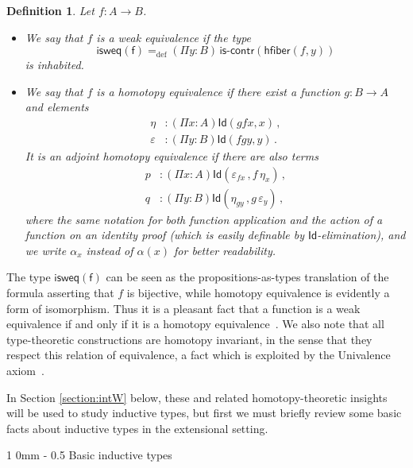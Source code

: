 \documentclass[reqno,10pt,a4paper,oneside]{amsart}
\makeatletter
\newcommand{\defeq}{=_{\mathrm{def}}}
\newcommand{\Id}{\mathsf{Id}}
\newcommand{\iscontr}{\mathsf{is}\text{-}\mathsf{contr}}
\newcommand{\hfiber}{\mathsf{hfiber}}
\renewcommand{\section}{\@startsection
  {section}%
   {1}%
  {0mm}%
   {-\baselineskip}%
  {0.5\baselineskip}%
   {\Large\bfseries}}%
\numberwithin{equation}{section}
\theoremstyle{mythm}
\theoremstyle{mydef}
\newtheorem{definition}[theorem]{Definition}
\theoremstyle{myrmk}
\makeatother
\begin{document}
\begin{definition} \label{thm:weq} Let $f : A \rightarrow B$.
\begin{itemize}
%
\item We say that $f$ is a \emph{weak equivalence} if  the type
\[
\mathsf{isweq(f)} \defeq (\Pi y : B) \,  \iscontr(\hfiber(f,y)) 
\]
is inhabited. 
%
\item We say that $f$ is a \emph{homotopy equivalence} if there exist a function 
$g : B\rightarrow A$ and elements
\begin{align*}
\eta &: (\Pi x : A) \Id( g  f  x , x) \,  ,\\
\varepsilon &: (\Pi y:B) \Id( f   g  y, y) \, .
\end{align*}
It is an \emph{adjoint homotopy equivalence} if there are also
terms
\begin{align*}
p &: (\Pi x : A) \Id ( \varepsilon_{f x} \, , f \, \eta_x )  \, , \\
q &: (\Pi y : B) \Id ( \eta_{g y} \, , g \, \varepsilon_y) \, ,
\end{align*}
where the same notation for both function application and
the action of a function on an identity proof (which is easily definable by $\Id$-elimination),
and we write $\alpha_x$ instead of $\alpha(x)$ for better readability.
%
\end{itemize}
\end{definition}

The type $\mathsf{isweq(f)}$ can be seen as the propositions-as-types translation of the formula asserting that $f$ is bijective, while homotopy equivalence is evidently a form of isomorphism. Thus it is a pleasant fact that a function is a weak equivalence if and only if it is a homotopy equivalence~\cite{VoevodskyV:unifc}. 
We also note that all type-theoretic constructions are homotopy invariant, in the sense that they respect this relation of equivalence, a fact which is exploited by the Univalence axiom~\cite{VoevodskyV:notts}.


\medskip

In Section \ref{section:intW} below, these and related homotopy-theoretic insights will be used to study inductive types, but first we must briefly review some basic facts about  inductive types in the extensional setting.

\newpage

\section{Basic inductive types}
\label{section:simple}
\end{document}
